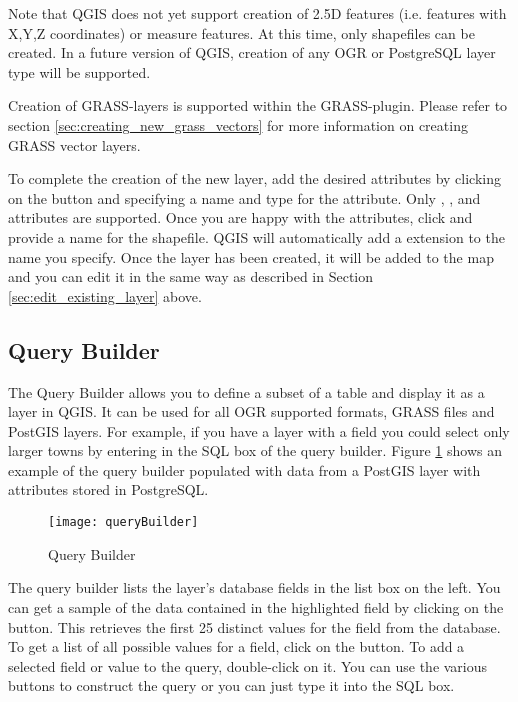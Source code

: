 Note that QGIS does not yet support creation of 2.5D
features (i.e. features with X,Y,Z coordinates) or measure features. At this
time, only shapefiles can be created. In a future version of QGIS, creation of
any OGR or PostgreSQL layer type will be supported. 

Creation of GRASS-layers is supported within the GRASS-plugin. Please refer to section
\ref{sec:creating_new_grass_vectors} for more information on creating GRASS vector 
layers.

To complete the creation of the new layer, add the desired attributes by
clicking on the  button and specifying a name and type for the
attribute. Only , , and  attributes are supported. Once you
are happy with the attributes, click  and provide a name for the shapefile.
QGIS will automatically add a  extension to the name you specify.  Once
the layer has been created, it will be added to the map and you can edit it in
the same way as described in Section \ref{sec:edit_existing_layer} above. 

\subsection{Query Builder}\label{sec:query_builder}

The Query Builder allows you to define a subset of a table and display
it as a layer in QGIS. It can be used for all OGR supported formats, GRASS 
files and PostGIS layers. For example, if you have a  layer with a
 field you could select only larger towns by entering
 in the SQL box of the query builder. Figure
\ref{fig:query_builder} shows an example of the query builder populated with
data from a PostGIS layer with attributes stored in PostgreSQL. 

\begin{figure}[ht]
  \begin{center}
    \caption{Query Builder \nixcaption}\label{fig:query_builder}\smallskip
    \texttt{[image: queryBuilder]}
  \end{center}  
\end{figure}

The query builder lists the layer's database
fields in the list box on the left. You can get a sample of the data
contained in the highlighted field by clicking on the  button. This retrieves the first 25 distinct values
for the field from the database. To get a list of all possible values for a
field, click on the  button. To add a selected field or value to the query, double-click on
it. You can use the various buttons to
construct the query or you can just type it into the SQL box.

